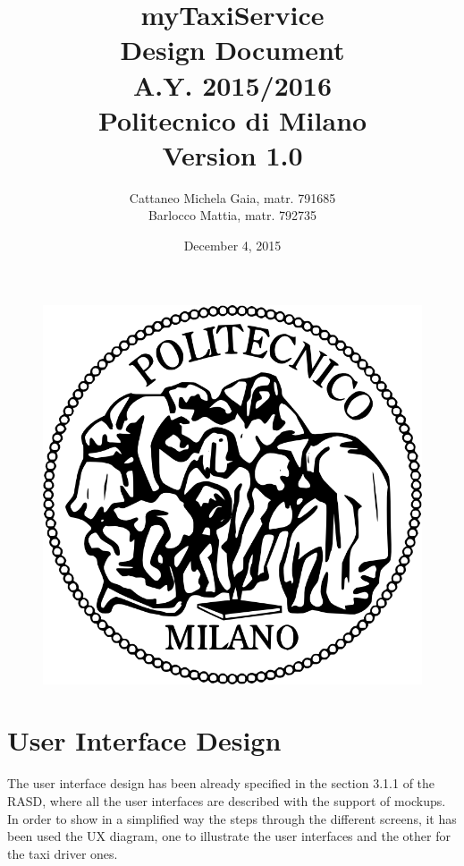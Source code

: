 \documentclass[18pt,oneside,a4paper, titlepage]{article}
\begin{document}
\begin{figure}[t]
	\centering
	\includegraphics[scale=0.35]{logo-polimi.png}
\end{figure}
\title{\textbf{myTaxiService}\\\textbf{D}esign \textbf{D}ocument\\ A.Y. 2015/2016\\
	Politecnico di Milano \\ Version 1.0}	
\author{Cattaneo Michela Gaia, matr. 791685\\Barlocco Mattia, matr. 792735 }
\date{December 4, 2015}
\maketitle

\newpage
	\tableofcontents

\newpage
	
		
	
\newpage	
	\section{User Interface Design}
		The user interface design has been already specified in the section 3.1.1 of the RASD, where all the user interfaces are described with the support of mockups.
		In order to show in a simplified way the steps through the different screens, it has been used the UX diagram, one to illustrate the user interfaces and the other for the taxi driver ones.
\end{document}
